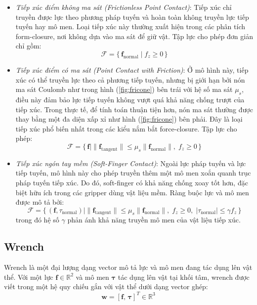 \begin{itemize}
    \item \textit{Tiếp xúc điểm không ma sát (Frictionless Point Contact)}: Tiếp xúc chỉ truyền được lực theo phương pháp tuyến và hoàn toàn không truyền lực tiếp tuyến hay mô men. Loại tiếp xúc này thường xuất hiện trong các phân tích form-closure, nơi không dựa vào ma sát để giữ vật. Tập lực cho phép đơn giản chỉ gồm:
    \begin{equation}
        \mathcal{F} = \{\, \mathbf{f}_{\mathrm{normal}} \mid f_z \geq 0 \,\}
    \label{eq:frlesscon}
    \end{equation}
    \item \textit{Tiếp xúc điểm có ma sát (Point Contact with Friction)}: Ở mô hình này, tiếp xúc có thể truyền lực theo cả phương tiếp tuyến, nhưng bị giới hạn bởi nón ma sát Coulomb như trong hình (\ref{fig:fricone}) bên trái với hệ số ma sát $\mu_s$, điều này đảm bảo lực tiếp tuyến không vượt quá khả năng chống trượt của tiếp xúc. Trong thực tế, để tính toán thuận tiện hơn, nón ma sát thường được thay bằng một đa diện xấp xỉ như hình (\ref{fig:fricone}) bên phải. Đây là loại tiếp xúc phổ biến nhất trong các kiểu nắm bắt force-closure. Tập lực cho phép:
    \begin{equation}
        \mathcal{F} = \{\, \mathbf{f} \mid \|\mathbf{f}_{\mathrm{tangent}}\| \leq \mu_s \|\mathbf{f}_{\mathrm{normal}}\|,\; f_z \geq 0 \,\}
    \label{eq:frcon}
    \end{equation}
    \item \textit{Tiếp xúc ngón tay mềm (Soft-Finger Contact)}: Ngoài lực pháp tuyến và lực tiếp tuyến, mô hình này cho phép truyền thêm một mô men xoắn quanh trục pháp tuyến tiếp xúc. Do đó, soft-finger có khả năng chống xoay tốt hơn, đặc biệt hữu ích trong các gripper dùng vật liệu mềm. Ràng buộc lực và mô men được mô tả bởi:
    \begin{equation}
        \mathcal{F} = \{\, (\mathbf{f}, \tau_{\mathrm{normal}}) \mid \|\mathbf{f}_{\mathrm{tangent}}\| \leq \mu_s \|\mathbf{f}_{\mathrm{normal}}\|,\;f_z \ge 0,\;|\tau_{\mathrm{normal}}| \le \gamma f_z\,\}
    \label{eq:softcon}
    \end{equation}
    trong đó hệ số $\gamma$ phản ánh khả năng truyền mô men của vật liệu tiếp xúc.
\end{itemize}

\subsection{Wrench}
Wrench là một đại lượng dạng vector mô tả lực và mô men đang tác dụng lên vật thể. Với một lực $\mathbf{f}\in \mathbb{R}^2$ và mô men $\boldsymbol{\tau}$ tác dụng lên vật tại khối tâm, wrench được viết trong một hệ quy chiếu gắn với vật thể dưới dạng vector ghép: 
\begin{equation}
    \mathbf{w} = [ \mathbf{f}, \,  \boldsymbol{\tau}]^{T} \in \mathbb{R}^3
\label{eq:wrench}
\end{equation}

